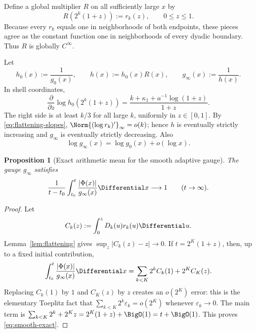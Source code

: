 \documentclass[11pt]{article}
\newtheorem{proposition}[theorem]{Proposition}
\theoremstyle{definition}
\theoremstyle{remark}
\begin{document}
Define a global multiplier \(R\) on all sufficiently large \(x\) by
\begin{equation}
 R(2^k(1+z)):=r_k(z),
 \qquad 0\le z\le1.
 \label{eq:R-global}
\end{equation}
Because every \(r_k\) equals one in neighborhoods of both endpoints, these
pieces agree as the constant function one in neighborhoods of every dyadic
boundary.  Thus \(R\) is globally \(C^\infty\).

Let
\begin{equation}
 h_0(x):=\frac1{g_0(x)},
 \qquad
 h(x):=h_0(x)R(x),
 \qquad
 g_{\infty}(x):=\frac1{h(x)}.
 \label{eq:smooth-adaptive}
\end{equation}
In shell coordinates,
\begin{equation}
 \frac{\partial}{\partial z}
 \log h_0(2^k(1+z))
 =\frac{k+\kappa_1+a^{-1}\log(1+z)}{1+z}.
 \label{eq:baseline-slope}
\end{equation}
The right side is at least \(k/3\) for all large \(k\), uniformly in
\(z\in[0,1]\).  By \eqref{eq:flattening-slopes},
\(\Norm{(\log r_k)'}_\infty=o(k)\); hence \(h\) is eventually strictly
increasing and \(g_\infty\) is eventually strictly decreasing.  Also
\begin{equation}
 \log g_\infty(x)=\log g_0(x)+o(\log x).
 \label{eq:smooth-rough}
\end{equation}

\begin{proposition}[Exact arithmetic mean for the smooth adaptive gauge]
\label{prop:smooth-adaptive}
The gauge \(g_\infty\) satisfies
\begin{equation}
 \frac1{t-t_0}\int_{t_0}^{t}
 \frac{|\Phi(x)|}{g_\infty(x)}\Differential x\longrightarrow1
 \qquad(t\to\infty).
 \label{eq:smooth-exact}
\end{equation}
\end{proposition}

\begin{proof}
Let
\[
 C_k(z):=\int_0^zD_k(u)r_k(u)\Differential u.
\]
Lemma~\ref{lem:flattening} gives
\(\sup_z|C_k(z)-z|\to0\).  If
\(t=2^K(1+z)\), then, up to a fixed initial contribution,
\[
 \int_{t_0}^{t}\frac{|\Phi(x)|}{g_\infty(x)}\Differential x
 =\sum_{k<K}2^kC_k(1)+2^KC_K(z).
\]
Replacing \(C_k(1)\) by \(1\) and \(C_K(z)\) by \(z\) creates an
\(o(2^K)\) error: this is the elementary Toeplitz fact that
\(\sum_{k<K}2^k\varepsilon_k=o(2^K)\) whenever \(\varepsilon_k\to0\).
The main term is
\(\sum_{k<K}2^k+2^Kz=2^K(1+z)+\BigO(1)=t+\BigO(1)\).
This proves \eqref{eq:smooth-exact}.
\end{proof}
\end{document}
